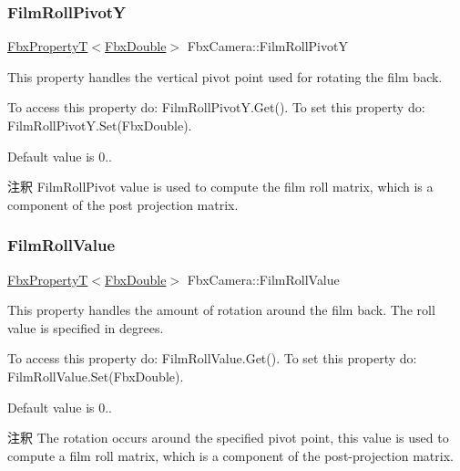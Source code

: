 \subsubsection{\texorpdfstring{Film\+Roll\+PivotY}{FilmRollPivotY}}
{\footnotesize\ttfamily \hyperlink{class_fbx_property_t}{Fbx\+PropertyT}$<$\hyperlink{fbxtypes_8h_a171e72a1c46fc15c1a6c9c31948c1c5b}{Fbx\+Double}$>$ Fbx\+Camera\+::\+Film\+Roll\+PivotY}

This property handles the vertical pivot point used for rotating the film back.

To access this property do\+: Film\+Roll\+Pivot\+Y.\+Get(). To set this property do\+: Film\+Roll\+Pivot\+Y.\+Set(\+Fbx\+Double).

Default value is 0.. \begin{DoxyRemark}{注釈}
Film\+Roll\+Pivot value is used to compute the film roll matrix, which is a component of the post projection matrix. 
\end{DoxyRemark}
\mbox{\label{class_fbx_camera_a80affb53985e548f42136ccd3b9d7a2e}} 
\subsubsection{\texorpdfstring{Film\+Roll\+Value}{FilmRollValue}}
{\footnotesize\ttfamily \hyperlink{class_fbx_property_t}{Fbx\+PropertyT}$<$\hyperlink{fbxtypes_8h_a171e72a1c46fc15c1a6c9c31948c1c5b}{Fbx\+Double}$>$ Fbx\+Camera\+::\+Film\+Roll\+Value}

This property handles the amount of rotation around the film back. The roll value is specified in degrees.

To access this property do\+: Film\+Roll\+Value.\+Get(). To set this property do\+: Film\+Roll\+Value.\+Set(\+Fbx\+Double).

Default value is 0.. \begin{DoxyRemark}{注釈}
The rotation occurs around the specified pivot point, this value is used to compute a film roll matrix, which is a component of the post-\/projection matrix. 
\end{DoxyRemark}
\mbox{\label{class_fbx_camera_a21d8a100a10638aafdbf69304c651c48}} 

